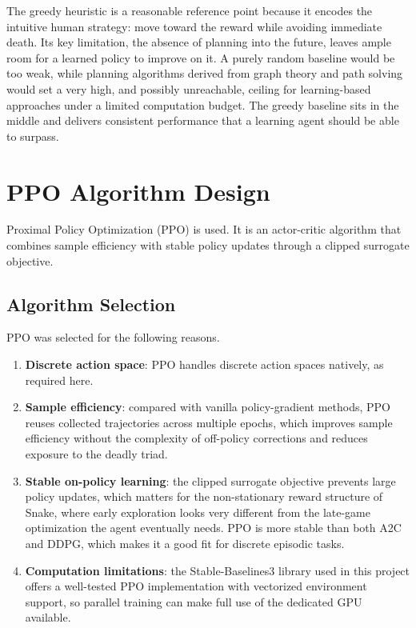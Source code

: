 \documentclass[10pt, conference, letterpaper]{IEEEtran}
\begin{document}
The greedy heuristic is a reasonable reference point because it encodes the intuitive human strategy: move toward the reward while avoiding immediate death. Its key limitation, the absence of planning into the future, leaves ample room for a learned policy to improve on it. A purely random baseline would be too weak, while planning algorithms derived from graph theory and path solving would set a very high, and possibly unreachable, ceiling for learning-based approaches under a limited computation budget. The greedy baseline sits in the middle and delivers consistent performance that a learning agent should be able to surpass.

\section{PPO Algorithm Design}

Proximal Policy Optimization (PPO) \cite{schulman2017ppo} is used. It is an actor-critic algorithm that combines sample efficiency with stable policy updates through a clipped surrogate objective.

\subsection{Algorithm Selection}

PPO was selected for the following reasons.

\begin{enumerate}
  \item \textbf{Discrete action space}: PPO handles discrete action spaces natively, as required here.
  \item \textbf{Sample efficiency}: compared with vanilla policy-gradient methods, PPO reuses collected trajectories across multiple epochs, which improves sample efficiency without the complexity of off-policy corrections and reduces exposure to the deadly triad.
  \item \textbf{Stable on-policy learning}: the clipped surrogate objective prevents large policy updates, which matters for the non-stationary reward structure of Snake, where early exploration looks very different from the late-game optimization the agent eventually needs. PPO is more stable than both A2C and DDPG, which makes it a good fit for discrete episodic tasks.
  \item \textbf{Computation limitations}: the Stable-Baselines3 \cite{raffin2021sb3} library used in this project offers a well-tested PPO implementation with vectorized environment support, so parallel training can make full use of the dedicated GPU available.
\end{enumerate}
\end{document}
